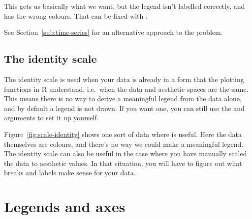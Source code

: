 This gets us basically what we want, but the legend isn't labelled correctly, and has the wrong colours.  That can be fixed with :

% 


See Section~\ref{sub:time-series} for an alternative approach to the problem.

\subsection{The identity scale}
\label{sub:scale-identity}

The identity scale is used when your data is already in a form that the plotting functions in R understand, i.e.\ when the data and aesthetic spaces are the same.  This means there is no way to derive a meaningful legend from the data alone, and by default a legend is not drawn.  If you want one, you can still use the  and  arguments to set it up yourself.

Figure~\ref{fig:scale-identity} shows one sort of data where  is useful.  Here the data themselves are colours, and there's no way we could make a meaningful legend.  The identity scale can also be useful in the case where you have manually scaled the data to aesthetic values.  In that situation, you will have to figure out what breaks and labels make sense for your data.

% 


\section{Legends and axes}
\label{sec:guides}

